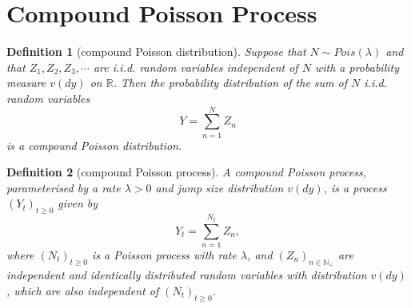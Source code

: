 \documentclass{report}
\newtheorem{definition}{Definition}[section]
\theoremstyle{nonumberplain}
\begin{document}
\section{Compound Poisson Process}
\begin{definition}[compound Poisson distribution]
	Suppose that
	$N\sim Pois(\lambda )$ and that $Z_{1},Z_{2},Z_{3},\cdots $ are i.i.d. random variables independent of $N$ with a probability measure $v(dy)$ on $\mathbb{R}$. Then the probability distribution of the sum of $N$ i.i.d. random variables
	\[
	Y=\sum _{n=1}^{N}Z_{n}
	\]
	is a \emph{compound Poisson distribution}.
\end{definition}


\begin{definition}[compound Poisson process]
	\emph{A compound Poisson process}, parameterised by a rate $\lambda >0$ and jump size distribution $v(dy)$, is a process $(Y_t)_{t\ge 0}$ given by
	\[
	Y_t=\sum _{n=1}^{N_t}Z_{n},
	\]
	where $(N_t)_{t\ge 0}$ is a Poisson process with rate $\lambda$, and $(Z_n)_{n\in \mathbb{N}_+}$ are independent and identically distributed random variables with distribution $v(dy)$, which are also independent of $(N_t)_{t\ge 0}$.
\end{definition}
\end{document}
